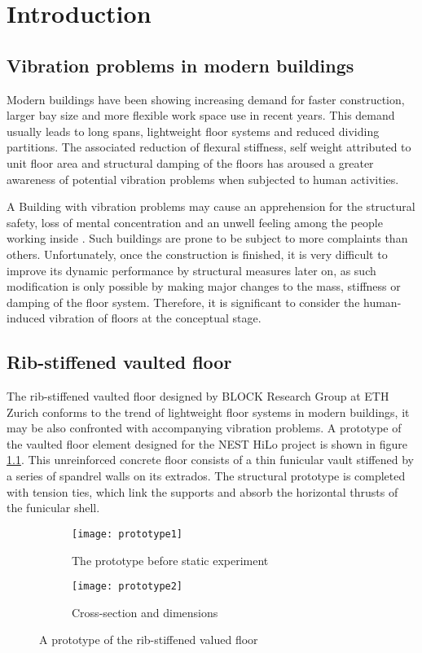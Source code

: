 \chapter{Introduction}
\label{chap1}

\section{Vibration problems in modern buildings}
Modern buildings have been showing increasing demand for faster construction, larger bay size and more flexible work space use in recent years. This demand usually leads to long spans, lightweight floor systems and reduced dividing partitions. The associated reduction of flexural stiffness, self weight attributed to unit floor area and structural damping of the floors has aroused a greater awareness of potential vibration problems when subjected to human activities.

A Building with vibration problems may cause an apprehension for the structural safety, loss of mental concentration and an unwell feeling among the people working inside \cite{bachmann2012vibration}. Such buildings are prone to be subject to more complaints than others. Unfortunately, once the construction is finished, it is very difficult to improve its dynamic performance by structural measures later on, as such modification is only possible by making major changes to the mass, stiffness or damping of the floor system. Therefore, it is significant to consider the human-induced vibration of floors at the conceptual stage.

\section{Rib-stiffened vaulted floor}
The rib-stiffened vaulted floor designed by BLOCK Research Group at ETH Zurich conforms to the trend of lightweight floor systems in modern buildings, it may be also confronted with accompanying vibration problems. A prototype of the vaulted floor element designed for the NEST HiLo project is shown in figure \ref{fig:prototype}. This unreinforced concrete floor consists of a thin funicular vault stiffened by a series of spandrel walls on its extrados. The structural prototype is completed with tension ties, which link the supports and absorb the horizontal thrusts of the funicular shell.
\begin{figure}[H]
\begin{subfigure}[b]{.9\textwidth}
  \centering
  \texttt{[image: prototype1]}
  \caption{The prototype before static experiment}
\end{subfigure}

\begin{subfigure}[b]{.9\textwidth}
  \centering
  \texttt{[image: prototype2]}
  \caption{Cross-section and dimensions}
\end{subfigure}

\caption{A prototype of the rib-stiffened valued floor \cite{prototype}}
\label{fig:prototype}
\end{figure}

